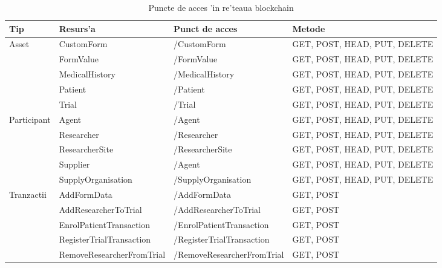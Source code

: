 \documentclass[12pt,a4paper,twoside]{report}
\begin{document}
    
    \begin{table}[H]
    \caption{Puncte de acces 'in re'teaua blockchain}
    \label{table:endpoints}
\centering
\begin{tabular}{|l|l|l|p{2.5cm}|}

\hline
Tip         & Resurs'a                   & Punct de acces             & Metode                       \\ \hline
Asset       & CustomForm                & /CustomForm                & GET, POST, HEAD, PUT, DELETE \\ \cline{2-4} 
            & FormValue                 & /FormValue                 & GET, POST, HEAD, PUT, DELETE \\ \cline{2-4} 
            & MedicalHistory            & /MedicalHistory            & GET, POST, HEAD, PUT, DELETE \\ \cline{2-4} 
            & Patient                   & /Patient                   & GET, POST, HEAD, PUT, DELETE \\ \cline{2-4} 
            & Trial                     & /Trial                     & GET, POST, HEAD, PUT, DELETE \\ \hline
Participant & Agent                     & /Agent                     & GET, POST, HEAD, PUT, DELETE \\ \cline{2-4} 
            & Researcher                & /Researcher                & GET, POST, HEAD, PUT, DELETE \\ \cline{2-4} 
            & ResearcherSite            & /ResearcherSite            & GET, POST, HEAD, PUT, DELETE \\ \cline{2-4} 
            & Supplier                  & /Agent                     & GET, POST, HEAD, PUT, DELETE \\ \cline{2-4} 
            & SupplyOrganisation        & /SupplyOrganisation        & GET, POST, HEAD, PUT, DELETE \\ \hline
Tranzactii  & AddFormData               & /AddFormData               & GET, POST                    \\ \cline{2-4} 
            & AddResearcherToTrial      & /AddResearcherToTrial      & GET, POST                    \\ \cline{2-4} 
            & EnrolPatientTransaction   & /EnrolPatientTransaction   & GET, POST                    \\ \cline{2-4} 
            & RegisterTrialTransaction  & /RegisterTrialTransaction  & GET, POST                    \\ \cline{2-4} 
            & RemoveResearcherFromTrial & /RemoveResearcherFromTrial & GET, POST                    \\ \hline
\end{tabular}
\end{table}
\end{document}
